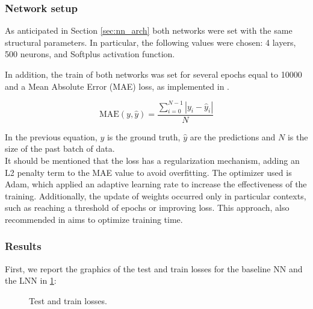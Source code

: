 \documentclass[a4paper]{article}
\begin{document}
\subsubsection{Network setup}
\label{sub:rigid_train}
As anticipated in Section \ref{sec:nn_arch} both networks were set with the same structural parameters. In particular, the following values were chosen: 4 layers, 500 neurons, and Softplus activation function.

In addition, the train of both networks was set for several epochs equal to 10000 and a Mean Absolute Error (MAE) loss, as implemented in \cite{lnncranmer}.

\begin{equation}
    \nonumber
    \text{MAE}(y, \hat{y}) = \frac{ \sum_{i=0}^{N - 1} |y_i - \hat{y}_i| }{N}
\end{equation}

In the previous equation, $y$ is the ground truth, $\hat{y}$ are the predictions and $N$ is the size of the past batch of data.\\

It should be mentioned that the loss has a regularization mechanism, adding an L2 penalty term to the MAE value to avoid overfitting.
The optimizer used is Adam, which applied an adaptive learning rate to increase the effectiveness of the training. Additionally, the update of weights occurred only in particular contexts, such as reaching a threshold of epochs or improving loss. This approach, also recommended in \cite{lnncranmer} aims to optimize training time.
\subsubsection{Results}
First, we report the graphics of the test and train losses for the baseline NN and the LNN in \ref{fig:rigid_losses}:

\begin{figure}
    \centering
    \qquad
    \caption{Test and train losses.}
    \label{fig:rigid_losses}
\end{figure}
\end{document}
